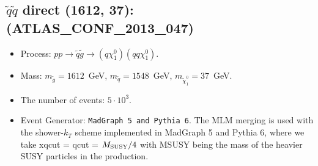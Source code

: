     
\subsection{$\tilde q \tilde q$ direct (1612, 37): (ATLAS\_CONF\_2013\_047)} 


        \begin{itemize}
        \item  Process: $pp \to \tilde q \tilde g \to (q \chi_1^0)(q q \chi_1^0)$.
        \item  Mass: $m_{\tilde g} = 1612$~GeV, $m_{\tilde q} = 1548$~GeV, $m_{\tilde \chi_1^0} = 37$~GeV.
        \item  The number of events: $5 \cdot 10^3$.
        \item  Event Generator: {\tt MadGraph 5 and Pythia 6}.
                The MLM merging is used with the shower-$k_T$ scheme implemented in MadGraph 5 and Pythia 6, where we take xqcut = qcut = $M_{\rm SUSY}/4$ with MSUSY being the mass of the heavier SUSY particles in the production.      
        \end{itemize}    
    
